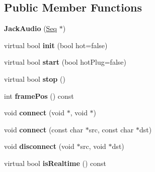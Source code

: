 \subsection*{Public Member Functions}
\begin{DoxyCompactItemize}
\item 
\mbox{\label{class_ms_1_1_jack_audio_ae5245529861d06aa1bb51da85f349e09}} 
{\bfseries Jack\+Audio} (\hyperlink{class_ms_1_1_seq}{Seq} $\ast$)
\item 
\mbox{\label{class_ms_1_1_jack_audio_a8d6aa4df1e9c97b0f2785cb6a2b74197}} 
virtual bool {\bfseries init} (bool hot=false)
\item 
\mbox{\label{class_ms_1_1_jack_audio_a893cc2a8d5a601739fe671807dd07ed4}} 
virtual bool {\bfseries start} (bool hot\+Plug=false)
\item 
\mbox{\label{class_ms_1_1_jack_audio_a74c530ff8a926fa9a790966c12e14ea7}} 
virtual bool {\bfseries stop} ()
\item 
\mbox{\label{class_ms_1_1_jack_audio_a4d542e29d970af29cca9b81cc3ee01da}} 
int {\bfseries frame\+Pos} () const
\item 
\mbox{\label{class_ms_1_1_jack_audio_a82d984f719064b2d69cc896d22cf5021}} 
void {\bfseries connect} (void $\ast$, void $\ast$)
\item 
\mbox{\label{class_ms_1_1_jack_audio_abc4ce814611ed805a52cfbdb11105e2f}} 
void {\bfseries connect} (const char $\ast$src, const char $\ast$dst)
\item 
\mbox{\label{class_ms_1_1_jack_audio_a97d282aaeda9b6a5ecb3612e16338fb0}} 
void {\bfseries disconnect} (void $\ast$src, void $\ast$dst)
\item 
\mbox{\label{class_ms_1_1_jack_audio_ae5b8972bd6408580d3cd27dd94f66b77}} 
virtual bool {\bfseries is\+Realtime} () const
\item 
\mbox{\label{class_ms_1_1_jack_audio_ad097e8b114205c8958fddfd9f0c15d14}} 

\end{DoxyCompactItemize}
